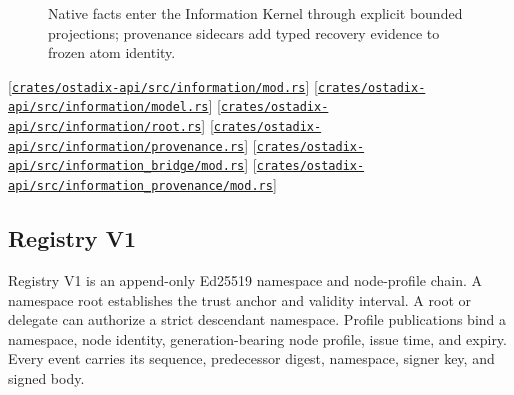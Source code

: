 \documentclass[11pt,oneside]{article}
\newcommand{\src}[1]{\textcolor{OSlate}{\scriptsize[\href{https://github.com/lostadi/OSTADIX/blob/c0b02c326b2329a95ba52447c7180bc93957cd57/#1}{\nolinkurl{#1}}]}\allowbreak}
\begin{document}
\begin{figure}[htbp]
\centering
{}
\caption{Native facts enter the Information Kernel through explicit bounded
projections; provenance sidecars add typed recovery evidence to frozen atom
identity.}
\label{fig:information-path}
\end{figure}

\src{crates/ostadix-api/src/information/mod.rs}
\src{crates/ostadix-api/src/information/model.rs}
\src{crates/ostadix-api/src/information/root.rs}
\src{crates/ostadix-api/src/information/provenance.rs}
\src{crates/ostadix-api/src/information_bridge/mod.rs}
\src{crates/ostadix-api/src/information_provenance/mod.rs}

\subsection{Registry V1}
\label{sec:registry}

Registry V1 is an append-only Ed25519 namespace and node-profile chain. A
namespace root establishes the trust anchor and validity interval. A root or
delegate can authorize a strict descendant namespace. Profile publications
bind a namespace, node identity, generation-bearing node profile, issue time,
and expiry. Every event carries its sequence, predecessor digest, namespace,
signer key, and signed body.
\end{document}

